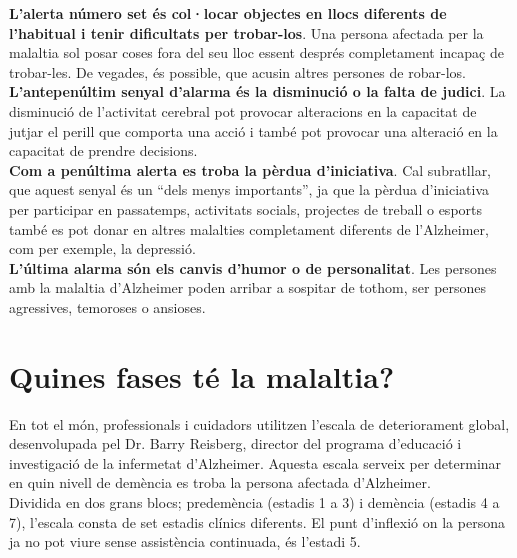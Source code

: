 \documentclass[a4paper,12pt]{report}
\begin{document}
\textbf{L'alerta número set és col·locar objectes en llocs diferents de l'habitual i tenir dificultats per trobar-los}. Una persona afectada per la malaltia sol posar coses fora del seu lloc essent després completament incapaç de trobar-les. De vegades, és possible, que acusin altres persones de robar-los.\\
\textbf{L'antepenúltim senyal d'alarma és la disminució o la falta de judici}. La disminució de l'activitat cerebral pot provocar alteracions en la capacitat de jutjar el perill que comporta una acció i també pot provocar una alteració en la capacitat de prendre decisions.\\
\textbf{Com a penúltima alerta es troba la pèrdua d'iniciativa}. Cal subratllar, que aquest senyal és un “dels menys importants”, ja que la pèrdua d'iniciativa per participar en passatemps, activitats socials, projectes de treball o esports també es pot donar en altres malalties completament diferents de l'Alzheimer, com per exemple, la depressió.\\
\textbf{L'última alarma són els canvis d'humor o de personalitat}. Les persones amb la malaltia d'Alzheimer poden arribar a sospitar de tothom, ser persones agressives, temoroses o ansioses.
\section*{Quines fases té la malaltia?}
En tot el món, professionals i cuidadors utilitzen l'escala de deteriorament global, desenvolupada pel Dr. Barry Reisberg, director del programa d'educació i investigació de la infermetat d'Alzheimer. Aquesta escala serveix per determinar en quin nivell de demència es troba la persona afectada d'Alzheimer.\\
Dividida en dos grans blocs; predemència (estadis 1 a 3) i demència (estadis 4 a 7), l'escala consta de set estadis clínics diferents. El punt d'inflexió on la persona ja no pot viure sense assistència continuada, és l'estadi 5.
\end{document}

